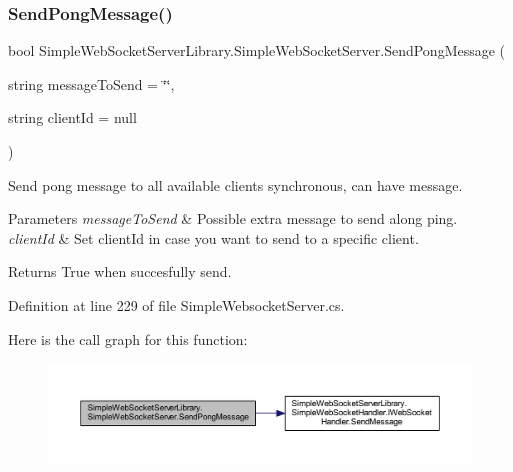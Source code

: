 \subsubsection{\texorpdfstring{Send\+Pong\+Message()}{SendPongMessage()}}
{\footnotesize\ttfamily bool Simple\+Web\+Socket\+Server\+Library.\+Simple\+Web\+Socket\+Server.\+Send\+Pong\+Message (\begin{DoxyParamCaption}\item[{string}]{message\+To\+Send = {\ttfamily \char`\"{}\char`\"{}},  }\item[{string}]{client\+Id = {\ttfamily null} }\end{DoxyParamCaption})}



Send pong message to all available clients synchronous, can have message. 


\begin{DoxyParams}{Parameters}
{\em message\+To\+Send} & Possible extra message to send along ping.\\
\hline
{\em client\+Id} & Set client\+Id in case you want to send to a specific client.\\
\hline
\end{DoxyParams}
\begin{DoxyReturn}{Returns}
True when succesfully send.
\end{DoxyReturn}


Definition at line 229 of file Simple\+Websocket\+Server.\+cs.

Here is the call graph for this function\+:
\nopagebreak
\begin{figure}[H]
\begin{center}
\leavevmode
\includegraphics[width=350pt]{class_simple_web_socket_server_library_1_1_simple_web_socket_server_af1f35a19ed0272c0bd02bf51f175b4b7_cgraph}
\end{center}
\end{figure}
\mbox{\label{class_simple_web_socket_server_library_1_1_simple_web_socket_server_a20bd2a898b9465f492a5b19c4a8e1021}} 
